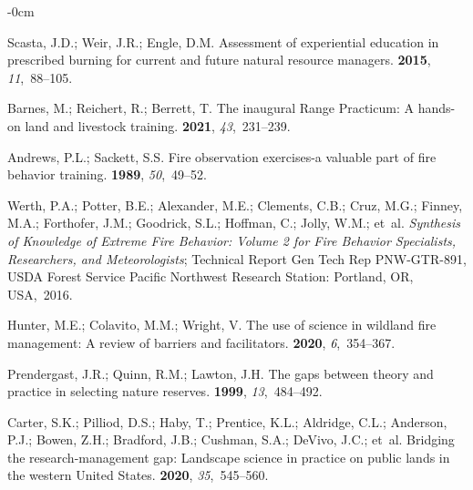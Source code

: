 \documentclass[fire,casereport,accept,moreauthors,pdftex]{Definitions/mdpi}  %
\begin{document}
\begin{adjustwidth}{-\extralength}{0cm}
\begin{thebibliography}{999}
Scasta, J.D.; Weir, J.R.; Engle, D.M.
\newblock Assessment of experiential education in prescribed burning for
  current and future natural resource managers.
 {\bf 2015}, {\em 11},~88--105.

Barnes, M.; Reichert, R.; Berrett, T.
\newblock The inaugural Range Practicum: A hands-on land and livestock
  training.
 {\bf 2021}, {\em 43},~231--239.

Andrews, P.L.; Sackett, S.S.
\newblock Fire observation exercises-a valuable part of fire behavior training.
 {\bf 1989}, {\em 50},~49--52.

Werth, P.A.; Potter, B.E.; Alexander, M.E.; Clements, C.B.; Cruz, M.G.; Finney,
  M.A.; Forthofer, J.M.; Goodrick, S.L.; Hoffman, C.; Jolly, W.M.;  et~al.
\newblock \emph{Synthesis of Knowledge of Extreme Fire Behavior: Volume 2 for Fire
  Behavior Specialists, Researchers, and Meteorologists};
\newblock Technical Report {Gen Tech Rep PNW-GTR-891}, USDA Forest Service
  Pacific Northwest Research Station: Portland, {OR}, USA,~2016.

Hunter, M.E.; Colavito, M.M.; Wright, V.
\newblock The use of science in wildland fire management: A review of barriers
  and facilitators.
 {\bf 2020}, {\em 6},~354--367.



Prendergast, J.R.; Quinn, R.M.; Lawton, J.H.
\newblock The gaps between theory and practice in selecting nature reserves.
 {\bf 1999}, {\em 13},~484--492.

Carter, S.K.; Pilliod, D.S.; Haby, T.; Prentice, K.L.; Aldridge, C.L.;
  Anderson, P.J.; Bowen, Z.H.; Bradford, J.B.; Cushman, S.A.; DeVivo, J.C.;
  et~al.
\newblock Bridging the research-management gap: Landscape science in practice
  on public lands in the western United States.
 {\bf 2020}, {\em 35},~545--560.


\end{thebibliography}
\end{adjustwidth}
\end{document}
